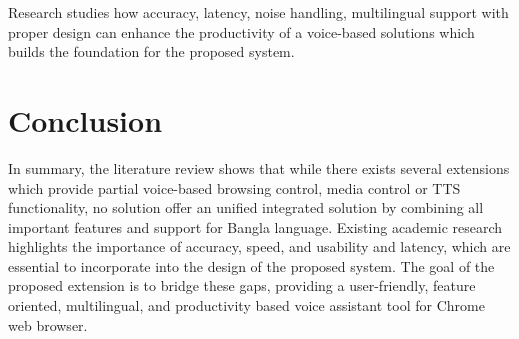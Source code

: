	Research studies how accuracy, latency, noise handling, multilingual support with proper design can enhance the productivity of a voice-based solutions which builds the foundation for the proposed system.
	
	\section{Conclusion}
	In summary, the literature review shows that while there exists several extensions which provide partial voice-based browsing control, media control or TTS functionality, no solution offer an unified integrated solution by combining all important features and support for Bangla language. Existing academic research highlights the importance of accuracy, speed, and usability and latency, which are essential to incorporate into the design of the proposed system. The goal of the proposed extension is to bridge these gaps, providing a user-friendly, feature oriented, multilingual, and productivity based voice assistant tool for Chrome web browser.
	







